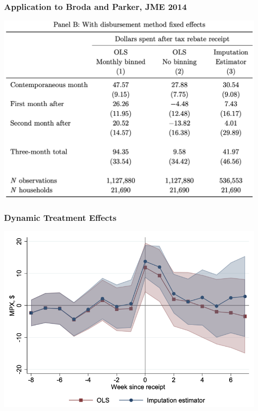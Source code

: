 \documentclass[english,xcolor=svgnames]{beamer}
\begin{document}
\begin{frame}
\frametitle[alignment=center]{Application to Broda and Parker, JME 2014}
\centering
\includegraphics[scale=0.4]{figures/BJSTAB3a.png}
\end{frame}

\begin{frame}
\frametitle[alignment=center]{Dynamic Treatment Effects}
\centering
\includegraphics[scale=0.5]{figures/BJSFIG2b.png}
\end{frame}
\end{document}
